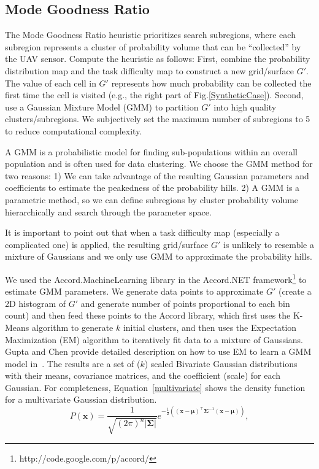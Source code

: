 \subsection{Mode Goodness Ratio}

The Mode Goodness Ratio heuristic prioritizes search subregions, where each subregion represents a cluster of probability volume that can be ``collected'' by the UAV sensor. Compute the heuristic as follows: First, combine the probability distribution map and the task difficulty map to construct a new grid/surface $G'$. The value of each cell in $G'$ represents how much probability can be collected the first time the cell is visited (e.g., the right part of Fig.\ref{SyntheticCase}). Second, use a Gaussian Mixture Model (GMM) to partition $G'$ into high quality clusters/subregions. We subjectively set the maximum number of subregions to 5 to reduce computational complexity.

A GMM is a probabilistic model for finding sub-populations within an overall population and is often used for data clustering. We choose the GMM method for two reasons: 1) We can take advantage of the resulting Gaussian parameters and coefficients to estimate the peakedness of the probability hills. 2) A GMM is a parametric method, so we can define subregions by cluster probability volume hierarchically and search through the parameter space.

It is important to point out that when a task difficulty map (especially a complicated one) is applied, the resulting grid/surface $G'$ is unlikely to resemble a mixture of Gaussians and we only use GMM to approximate the probability hills.

We used the Accord.MachineLearning library in the Accord.NET framework\footnote{http://code.google.com/p/accord/} to estimate GMM parameters. We generate data points to approximate $G'$ (create a 2D histogram of $G'$ and generate number of points proportional to each bin count) and then feed these points to the Accord library, which first uses the K-Means algorithm to generate $k$ initial clusters, and then uses the Expectation Maximization (EM) algorithm to iteratively fit data to a mixture of Gaussians. Gupta and Chen provide detailed description on how to use EM to learn a GMM model in~\cite{Gupta2011Theory}. The results are a set of ($k$) scaled Bivariate Gaussian distributions with their means, covariance matrices, and the coefficient (scale) for each Gaussian. For completeness, Equation~\ref{multivariate} shows the density function for a multivariate Gaussian distribution.
\begin{equation}
P(\mathbf{x}) = \frac{1}{\sqrt{(2\pi)^n|\mathbf{\Sigma}|}} e^{-\frac{1}{2}\left( (\mathbf{x}-\mathbf{\mu})^{\top}\mathbf{\Sigma}^{-1} (\mathbf{x}-\mathbf{\mu}) \right)} ,
\label{multivariate}
\end{equation}

